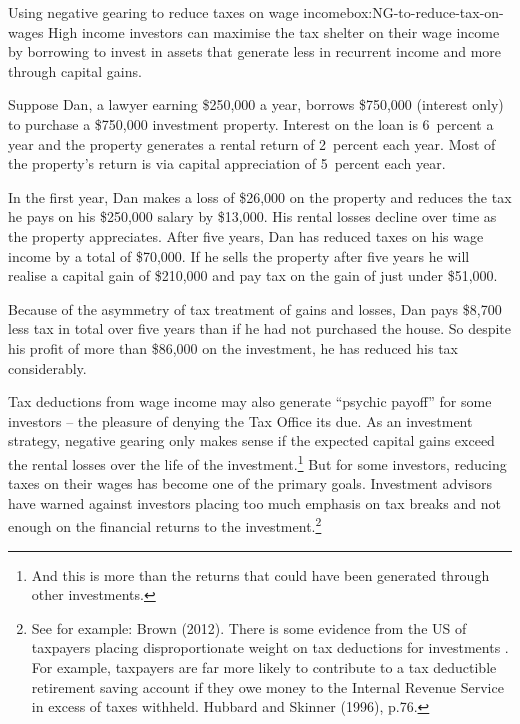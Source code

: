 \documentclass{grattan}\usepackage[]{graphicx}\usepackage[]{color}
\begin{document}
\begin{smallbox}{Using negative gearing to reduce taxes on wage income}{box:NG-to-reduce-tax-on-wages}
High income investors can maximise the tax shelter on their wage income
by borrowing to invest in assets that generate less in recurrent income
and more through capital gains.



Suppose Dan, a lawyer earning \$250,000 a year, 
borrows \$750,000 %
(interest only)
to purchase a \$750,000 investment property. Interest on the loan is 6~percent a
year and the property generates a rental return of 2~percent each
year. Most of the property's return is via capital appreciation of 5~percent each year.

In the first year, Dan makes a loss of \$26,000 
on the property and
reduces the tax he pays on his \$250,000 salary by 
\$13,000. His rental
losses decline over time as the property appreciates. After five years,
Dan has reduced taxes on his wage income by a total of 
\$70,000. If he
sells the property after five years he will realise a capital gain of
\$210,000 and pay tax on 
the gain of just under \$51,000.

Because of the asymmetry of tax treatment of gains and losses, Dan pays
\$8,700 less tax in total over five years than if he had not purchased
the house. So despite his profit of more than \$86,000 on the
investment, he has reduced his tax considerably.
\end{smallbox}
Tax deductions from wage income may also generate ``psychic payoff'' for
some investors -- the pleasure of denying the Tax Office its due. As an
investment strategy, negative gearing only makes sense if the expected
capital gains exceed the rental losses over the life of the
investment.\footnote{And this is more than the returns that could have
  been generated through other investments.} But for some investors,
reducing taxes on their wages has become one of the primary goals.
Investment advisors have warned against investors placing too much
emphasis on tax breaks and not enough on the financial returns to the
investment.\footnote{See for example: Brown (2012). There is some
  evidence from the US of taxpayers placing disproportionate weight on
  tax deductions for investments . For example, taxpayers are far more
  likely to contribute to a tax deductible retirement saving account if
  they owe money to the Internal Revenue Service in excess of taxes
  withheld. Hubbard and Skinner (1996), p.76.}
  
\end{document}
